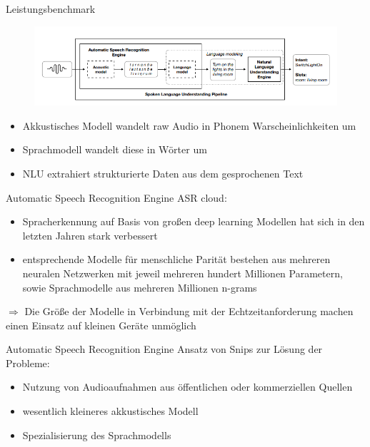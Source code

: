 \documentclass[aspectratio=169]{beamer}
\begin{document}
\begin{frame}{Leistungsbenchmark}
	\begin{figure}
		\includegraphics[scale=0.45]{images/spoken-language-understanding}
	\end{figure}
	\begin{itemize}
		\item Akkustisches Modell wandelt raw Audio in Phonem Warscheinlichkeiten um
		\item Sprachmodell wandelt diese in Wörter um
		\item NLU extrahiert strukturierte Daten aus dem gesprochenen Text
	\end{itemize}
\end{frame}

\begin{frame}{Automatic Speech Recognition Engine}
	ASR cloud:
	\begin{itemize}
		\item Spracherkennung auf Basis von großen deep learning Modellen hat sich in den letzten Jahren stark verbessert
		\item entsprechende Modelle für menschliche Parität bestehen aus mehreren neuralen Netzwerken mit jeweil mehreren hundert Millionen Parametern, sowie Sprachmodelle aus mehreren Millionen n-grams
	\end{itemize}
	$\Rightarrow$ Die Größe der Modelle in Verbindung mit der Echtzeitanforderung machen einen Einsatz auf kleinen Geräte unmöglich
\end{frame}

\begin{frame}{Automatic Speech Recognition Engine}
	Ansatz von Snips zur Lösung der Probleme:
	\begin{itemize}
		\item Nutzung von Audioaufnahmen aus öffentlichen oder kommerziellen Quellen
		\item wesentlich kleineres akkustisches Modell
		\item Spezialisierung des Sprachmodells
	\end{itemize}
\end{frame}
\end{document}
